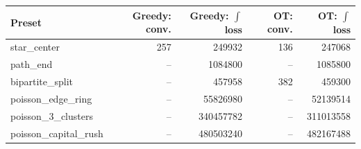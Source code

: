 \begin{tabular}{lrrrr}
\toprule
Preset & Greedy: conv. & Greedy: $\int$loss & OT: conv. & OT: $\int$loss \\
\midrule
star\_center & 257 & 249932 & 136 & 247068 \\
path\_end & -- & 1084800 & -- & 1085800 \\
bipartite\_split & -- & 457958 & 382 & 459300 \\
poisson\_edge\_ring & -- & 55826980 & -- & 52139514 \\
poisson\_3\_clusters & -- & 340457782 & -- & 311013558 \\
poisson\_capital\_rush & -- & 480503240 & -- & 482167488 \\
\bottomrule
\end{tabular}
